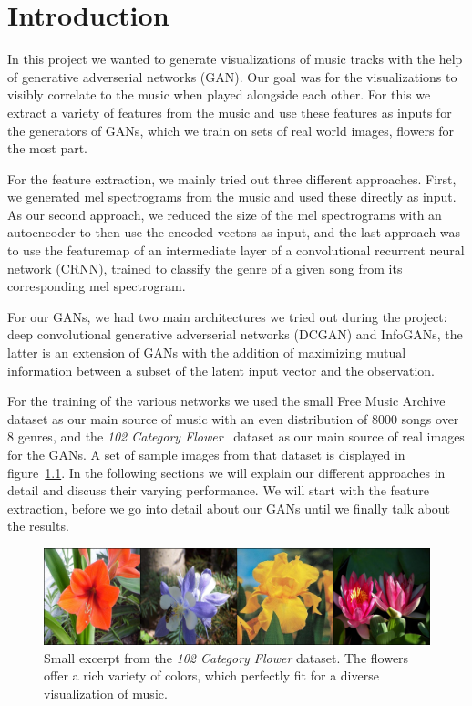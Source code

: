 \chapter{Introduction}
    In this project we wanted to generate visualizations of music tracks with the help of generative adverserial networks (GAN). Our goal was for the visualizations to visibly correlate to the music when played alongside each other. For this we extract a variety of features from the music and use these features as inputs for the generators of GANs, which we train on sets of real world images, flowers for the most part.

    For the feature extraction, we mainly tried out three different approaches. First, we generated mel spectrograms from the music and used these directly as input. As our second approach, we reduced the size of the mel spectrograms with an autoencoder to then use the encoded vectors as input, and the last approach was to use the featuremap of an intermediate layer of a convolutional recurrent neural network (CRNN), trained to classify the genre of a given song from its corresponding mel spectrogram.

    For our GANs, we had two main architectures we tried out during the project: deep convolutional generative adverserial networks (DCGAN) and InfoGANs, the latter is an extension of GANs with the addition of maximizing mutual information between a subset of the latent input vector and the observation.

    For the training of the various networks we used the small Free Music Archive~\cite{FMA} dataset as our main source of music with an even distribution of 8000 songs over 8 genres, and the \textit{102 Category Flower}~\cite{102flower} dataset as our main source of real images for the GANs. A set of sample images from that dataset is displayed in figure~\ref{fig:flowers}. In the following sections we will explain our different approaches in detail and discuss their varying performance. We will start with the feature extraction, before we go into detail about our GANs until we finally talk about the results.

    \begin{figure}
        \centering
        \includegraphics[width=\textwidth]{images/real_samples}
        \caption{Small excerpt from the \textit{102 Category Flower} dataset. The flowers offer a rich variety of colors, which perfectly fit for a diverse visualization of music.}
        \label{fig:flowers}
    \end{figure}